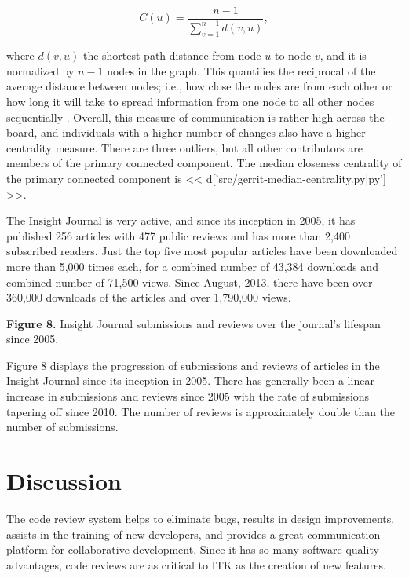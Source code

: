\documentclass{frontiersENG} %
\begin{document}
\begin{equation}
   C(u) = \frac{n - 1}{\sum_{v=1}^{n-1} d(v, u)},
\end{equation}

where $d(v, u)$ the shortest path distance from node $u$ to node $v$, and it
is normalized by $n-1$ nodes in the graph. This quantifies the reciprocal of the
average distance between nodes; i.e., how close the nodes are from each other
or how long it will take to spread information from one node to all other
nodes sequentially \cite{Newman2005}. Overall, this measure of communication is
rather high across the board, and individuals with a higher
number of changes also have a higher centrality measure.  There are three
outliers, but all other contributors are members of the primary connected
component. The median closeness centrality of the primary connected component is
<< d['src/gerrit-median-centrality.py|py'] >>.


%
%
%
The Insight Journal is very active, and since its inception in 2005, it has published
256 articles with 477 public reviews and has more than 2,400 subscribed
readers. Just the top five most popular articles have been downloaded more than
5,000 times each, for a combined number of 43,384 downloads and combined number
of 71,500 views. Since August, 2013, there have been over 360,000 downloads of
the articles and over 1,790,000 views.

\textbf{Figure 8. }{Insight Journal submissions and reviews over the journal's
lifespan since 2005.} \label{fig:08}

Figure 8 displays the progression of submissions and reviews of articles in
the Insight Journal since its inception in 2005.  There has generally been a
linear increase in submissions and reviews since 2005 with the rate of
submissions tapering off since 2010.  The number of reviews is approximately
double than the number of submissions.



\section{Discussion}
The code review system helps to eliminate bugs, results in design improvements,
assists in the training of new developers, and provides a great communication
platform for collaborative development. Since it has so many software quality
advantages, code reviews are as critical to ITK as the creation of new features.
\end{document}
